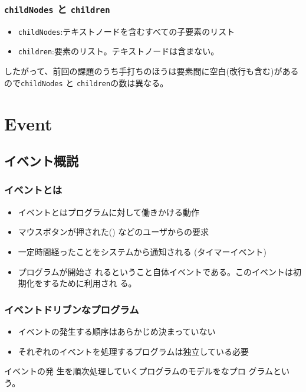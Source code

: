 \begin{frame}[containsverbatim]
\frametitle{\texttt{childNodes} と \texttt{children}}
\begin{itemize}
 \item \texttt{childNodes}:テキストノードを含むすべての子要素のリスト
 \item \texttt{children}:要素のリスト。テキストノードは含まない。
\end{itemize}
したがって、前回の課題のうち手打ちのほうは要素間に空白(改行も含む)がある
 ので\texttt{childNodes} と \texttt{children}の数は異なる。
\end{frame}
\fi
\section{Event}
\subsection{イベント概説}
\begin{frame}[containsverbatim]
\frametitle{イベントとは}
\begin{itemize}
 \item イベントとはプログラムに対して働きかける動作
 \item マウスボタンが押された()
などのユーザからの要求
 \item 一定時間経ったことをシステムから通知される
(タイマーイベント)
 \item プログラムが開始さ
れるということ自体イベントである。このイベントは初期化をするために利用され
る。
\end{itemize}
\end{frame}
\begin{frame}[containsverbatim]
\frametitle{イベントドリブンなプログラム}
\begin{itemize}
 \item イベントの発生する順序はあらかじめ決まっていない
 \item それぞれのイベントを処理するプログラムは独立している必要
\end{itemize}
イベントの発
生を順次処理していくプログラムのモデルをなプロ
グラムという。
\end{frame}
